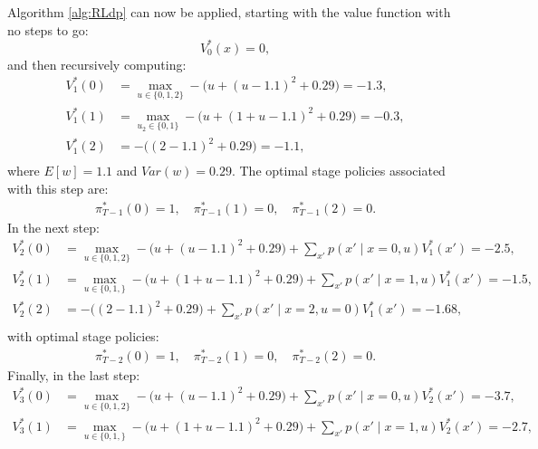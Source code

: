 \begin{example}
Algorithm \ref{alg:RLdp} can now be applied, starting with the value function with no steps to go:
\begin{equation*}
V^*_0(x) = 0,
\end{equation*}
and then recursively computing:
\begin{equation*}
\begin{split}
V^*_1(0) &= \underset{u \in \{0,1,2\}}{\max} -\big(u + (u - 1.1)^2 + 0.29\big) = -1.3, \\
V^*_1(1) &= \underset{u_2 \in \{0,1\}}{\max} -\big(u + (1 + u - 1.1)^2 + 0.29\big) = -0.3,\\
V^*_1(2) &= -\big((2 - 1.1)^2 + 0.29\big) = -1.1, \\
\end{split}
\end{equation*}
where $E[w] = 1.1$ and $Var(w) = 0.29$.
The optimal stage policies associated with this step are:
\begin{equation*}
\begin{split}
\pi^*_{T-1}(0) = 1, \quad \pi^*_{T-1}(1) = 0, \quad \pi^*_{T-1}(2) = 0.
\end{split}
\end{equation*}
In the next step:
\begin{equation*}
\begin{split}
V^*_2(0) &= \underset{u \in \{0,1,2\}}{\max} -\big(u + (u - 1.1)^2 + 0.29\big) + \sum_{x'} p(x' \mid x=0, u)V^*_1(x') = -2.5, \\
V^*_2(1) &= \underset{u \in \{0,1,\}}{\max} -\big(u + (1 + u - 1.1)^2 + 0.29\big) + \sum_{x'} p(x' \mid x=1, u)V^*_1(x') = -1.5,\\
V^*_2(2) &= -\big((2 - 1.1)^2 + 0.29\big) + \sum_{x'} p(x' \mid x=2, u=0)V^*_1(x') = -1.68,\\
\end{split}
\end{equation*}
with optimal stage policies:
\begin{equation*}
\begin{split}
\pi^*_{T-2}(0) = 1, \quad \pi^*_{T-2}(1) = 0, \quad \pi^*_{T-2}(2) = 0.
\end{split}
\end{equation*}
Finally, in the last step:
\begin{equation*}
\begin{split}
V^*_3(0) &= \underset{u \in \{0,1,2\}}{\max} -\big(u + (u - 1.1)^2 + 0.29\big) + \sum_{x'} p(x' \mid x=0, u)V^*_2(x') = -3.7, \\
V^*_3(1) &= \underset{u \in \{0,1,\}}{\max} -\big(u + (1 + u - 1.1)^2 + 0.29\big)  + \sum_{x'} p(x' \mid x=1, u)V^*_2(x')= -2.7,\\

\end{split}
\end{equation*}
\end{example}
